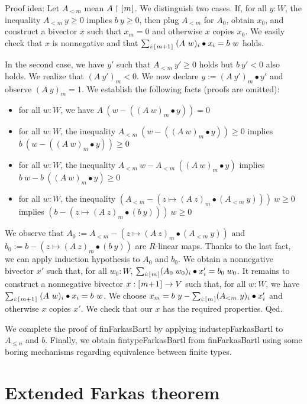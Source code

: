 \documentclass[]{article}
\renewcommand{\.}{\hskip .75pt}
\newcommand{\fin}[1]{[\.#1\.]}
\let\r=\rightarrow
\begin{document}
\medskip \noindent
Proof idea:
Let $A_{<m}$ mean $A \restriction \fin{m}$.
We distinguish two cases. If, for all $y : W$, the inequality
$A_{<m}~y \ge 0$ implies $b~y \ge 0$, then plug $A_{<m}$
for $A_0$, obtain $x_0$, and construct a bivector $x$ such that
$x_m = 0$ and otherwise $x$ copies $x_0$. We easily check that
$x$ is nonnegative and that
$ \sum_{i : \fin{m+1}}\; (A~w)_i \bullet x_i = b~w $ holds.

In the second case, we have $y'$ such that $A_{<m}~y' \ge 0$
holds but $b~y' < 0$ also holds. We realize that $(A~y')_m < 0$.
We now declare $y := (A~y')_m \bullet y'$ and observe
$(A~y)_m = 1$. We establish the following facts (proofs are omitted):
\begin{itemize}
\item for all $w : W$, we have $A~(w - ((A~w)_m \bullet y)) = 0$
\item for all $w : W$, the inequality $A_{<m}~(w - ((A~w)_m \bullet y)) \ge 0$
implies $b~(w - ((A~w)_m \bullet y)) \ge 0$
\item for all $w : W$, the inequality $A_{<m}~w - A_{<m}~((A~w)_m \bullet y)$
implies $b~w - b~((A~w)_m \bullet y) \ge 0$
\item for all $w : W$, the inequality $(A_{<m} - (z \mapsto (A~z)_m \bullet (A_{<m}~y)))~w \ge 0$
implies $(b - (z \mapsto (A~z)_m \bullet (b~y)))~w \ge 0$
\end{itemize}
We observe that
$A_0 := A_{<m} - (z \mapsto (A~z)_m \bullet (A_{<m}~y))$
and
$b_0 := b - (z \mapsto (A~z)_m \bullet (b~y))$
are $R$-linear maps.
Thanks to the last fact, we can apply induction hypothesis to $A_0$ and $b_0$.
We obtain a nonnegative bivector $x'$ such that,
for all $w_0 : W$, $ \sum_{i : \fin{m}} (A_0\;w_0)_i \bullet x'_i = b_0\;w_0 $.
It remains to construct a nonnegative bivector $x : \fin{m\!+\!1} \r V$
such that, for all $w : W$, we have
$ \sum_{i : \fin{m+1}}\; (A~w)_i \bullet x_i = b~w $.
We choose $x_m = b~y - \sum_{i : \fin{m}} (A_{<m}~y)_i \bullet x'_i$
and otherwise $x$ copies $x'$. We check that our $x$ has the required
properties. Qed.

\medskip
We complete the proof of finFarkasBartl by applying industepFarkasBartl
to $A_{\le n}$ and $b$. Finally, we obtain fintypeFarkasBartl from
finFarkasBartl using some boring mechanisms regarding equivalence between
finite types.


\section {Extended Farkas theorem}
\end{document}
